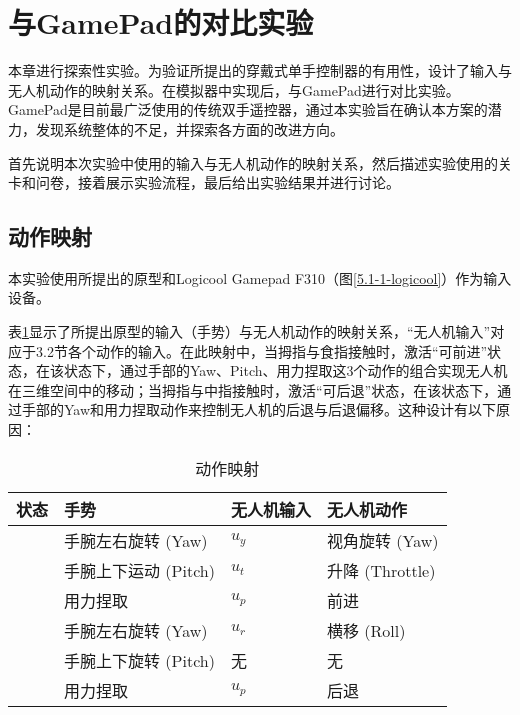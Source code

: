 \ifx\allfiles\undefined


\else
\fi

\section{与GamePad的对比实验}
 
本章进行探索性实验。为验证所提出的穿戴式单手控制器的有用性，设计了输入与无人机动作的映射关系。在模拟器中实现后，与GamePad进行对比实验。GamePad是目前最广泛使用的传统双手遥控器，通过本实验旨在确认本方案的潜力，发现系统整体的不足，并探索各方面的改进方向。

首先说明本次实验中使用的输入与无人机动作的映射关系，然后描述实验使用的关卡和问卷，接着展示实验流程，最后给出实验结果并进行讨论。

\subsection{动作映射}

本实验使用所提出的原型和Logicool Gamepad F310（图\ref{5.1-1-logicool}）作为输入设备。

表\ref{tab:gesture}显示了所提出原型的输入（手势）与无人机动作的映射关系，“无人机输入”对应于3.2节各个动作的输入。在此映射中，当拇指与食指接触时，激活“可前进”状态，在该状态下，通过手部的Yaw、Pitch、用力捏取这3个动作的组合实现无人机在三维空间中的移动；当拇指与中指接触时，激活“可后退”状态，在该状态下，通过手部的Yaw和用力捏取动作来控制无人机的后退与后退偏移。这种设计有以下原因：

\begin{table}[htbp]
    \centering
    \caption{\label{tab:gesture}动作映射}
    \begin{tabular}{>{\centering\arraybackslash}p{1.5cm} >{\centering\arraybackslash}p{3.8cm} >{\centering\arraybackslash}p{2cm} >{\centering\arraybackslash}p{3cm}}
        \toprule
        \textbf{状态} & \textbf{手势}           & \textbf{无人机输入} & \textbf{无人机动作} \\
        \midrule
        \multirow{3}{3cm}{可前进}
                      & 手腕左右旋转 (Yaw)       & \(u_y\)        & 视角旋转 (Yaw)    \\
                      & 手腕上下运动 (Pitch)     & \(u_t\)        & 升降 (Throttle) \\
                      & 用力捏取               & \(u_p\)        & 前进            \\
        \midrule
        \multirow{3}{3cm}{可后退}
                      & 手腕左右旋转 (Yaw)       & \(u_r\)        & 横移 (Roll)     \\
                      & 手腕上下旋转 (Pitch)     & 无               & 无             \\
                      & 用力捏取               & \(u_p\)        & 后退            \\
        \bottomrule
    \end{tabular}
\end{table}

